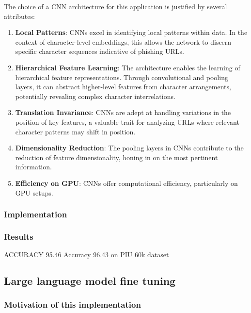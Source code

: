 \documentclass{article}
\begin{document}
    The choice of a CNN architecture for this application is justified by several attributes:
    \begin{enumerate}
        \item \textbf{Local Patterns}: CNNs excel in identifying local patterns within data.
        In the context of character-level embeddings, this allows the network to discern specific character sequences indicative of phishing URLs.
        \item \textbf{Hierarchical Feature Learning}: The architecture enables the learning of hierarchical feature representations.
        Through convolutional and pooling layers, it can abstract higher-level features from character arrangements, potentially revealing complex character interrelations.
        \item \textbf{Translation Invariance}: CNNs are adept at handling variations in the position of key features, a valuable trait for analyzing URLs where relevant character patterns may shift in position.
        \item \textbf{Dimensionality Reduction}: The pooling layers in CNNs contribute to the reduction of feature dimensionality, honing in on the most pertinent information.
        \item \textbf{Efficiency on GPU}: CNNs offer computational efficiency, particularly on GPU setups.
    \end{enumerate}

    \subsubsection{Implementation}

    \subsubsection{Results}




    \cite{CharacterLevelCNN} ACCURACY 95.46
    \cite{PhishingLoginURLDetection} Accuracy 96.43 on PIU 60k dataset

    \subsection{Large language model fine tuning}\label{subsec:large-language-model-finetuning}

    \subsubsection{Motivation of this implementation}
\end{document}
